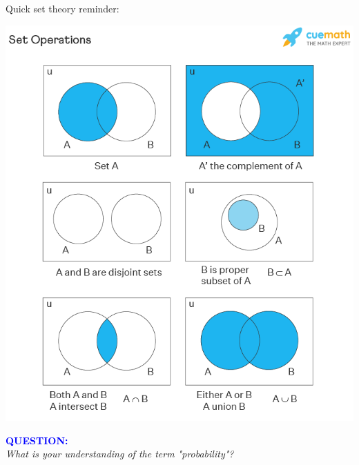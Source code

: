 \documentclass{beamer}
\begin{document}
\begin{frame}{}\begin{minipage}{.35\linewidth}
     Quick set theory reminder:
\end{minipage}%
\begin{minipage}{.65\linewidth}
    \vspace{-1.2cm}
  \includegraphics[height=\paperheight]{figures/SetOperationsold.png}
\end{minipage}
\end{frame}

\begin{frame}{}
    \begin{center}
        \textcolor{blue}{\textbf{\Large{QUESTION:}}}\bigskip\\

        \emph{\Large What is your understanding of the term "probability"?}
    \end{center}
  \end{frame}
\end{document}

